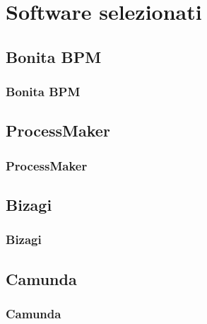 \documentclass[compress,9pt]{beamer}
\begin{document}
\section{Software selezionati}
\newcommand{\progname}{Bonita BPM}
\subsection{\progname}
\begin{frame}%
\frametitle{\progname}
\end{frame}

\renewcommand{\progname}{ProcessMaker}
\subsection{\progname}
\begin{frame}%
\frametitle{\progname}
\end{frame}

\renewcommand{\progname}{Bizagi}
\subsection{\progname}
\begin{frame}%
\frametitle{\progname}
\end{frame}

\renewcommand{\progname}{Camunda}
\subsection{\progname}
\begin{frame}%
\frametitle{\progname}
\end{frame}
\end{document}
